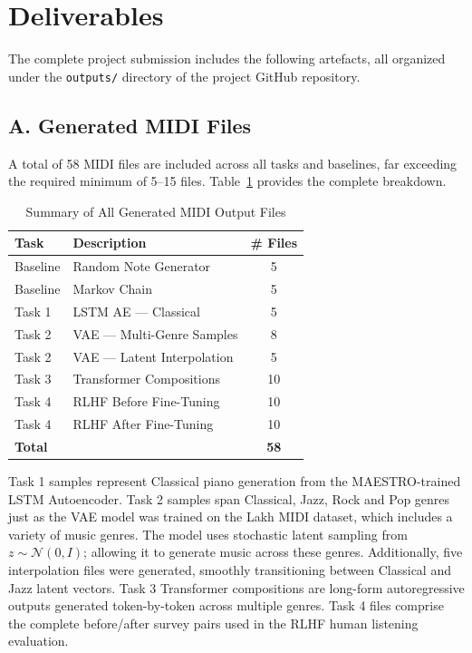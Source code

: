 \documentclass[conference]{IEEEtran}
\begin{document}
\section{Deliverables}
\label{sec:deliverables}

The complete project submission includes the following artefacts, all organized
under the \texttt{outputs/} directory of the project GitHub repository.

\subsection*{A. Generated MIDI Files}
A total of 58 MIDI files are included across all tasks and baselines, far
exceeding the required minimum of 5--15 files. Table~\ref{tab:midi_files}
provides the complete breakdown.

\begin{table}[htbp]
\caption{Summary of All Generated MIDI Output Files}
\begin{center}
\begin{tabular}{|l|l|c|}
\hline
\textbf{Task} & \textbf{Description} & \textbf{\# Files} \\
\hline
Baseline & Random Note Generator        & 5  \\
Baseline & Markov Chain                 & 5  \\
Task 1   & LSTM AE --- Classical        & 5  \\
Task 2   & VAE --- Multi-Genre Samples  & 8  \\
Task 2   & VAE --- Latent Interpolation & 5  \\
Task 3   & Transformer Compositions     & 10 \\
Task 4   & RLHF Before Fine-Tuning      & 10 \\
Task 4   & RLHF After Fine-Tuning       & 10 \\
\hline
\textbf{Total} &                        & \textbf{58} \\
\hline
\end{tabular}
\label{tab:midi_files}
\end{center}
\end{table}

Task 1 samples represent Classical piano generation from the MAESTRO-trained
LSTM Autoencoder. Task 2 samples span Classical, Jazz, Rock and Pop genres just as the VAE model was trained on the Lakh MIDI dataset, which includes a variety of music genres. The model uses stochastic latent sampling from $z \sim \mathcal{N}(0, I)$; allowing it to generate music across these genres. Additionally, five interpolation files were generated, smoothly transitioning between Classical and Jazz latent vectors. Task 3 Transformer compositions are long-form autoregressive outputs
generated token-by-token across multiple genres. Task 4 files comprise the
complete before/after survey pairs used in the RLHF human listening evaluation.
\end{document}
